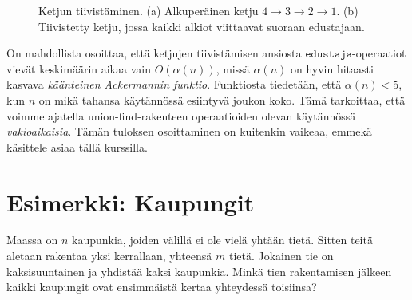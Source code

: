 \begin{figure}
\center
\begin{center}
\end{center}
\caption{Ketjun tiivistäminen. (a) Alkuperäinen ketju $4 \rightarrow 3 \rightarrow 2 \rightarrow 1$.
(b) Tiivistetty ketju, jossa kaikki alkiot viittaavat suoraan edustajaan.}
\label{fig:poltii}
\end{figure}

On mahdollista osoittaa, että ketjujen tiivistämisen ansiosta
$\texttt{edustaja}$-ope\-raatiot vievät keskimäärin aikaa vain
$O(\alpha(n))$, missä $\alpha(n)$ on hyvin hitaasti kasvava
\emph{käänteinen Ackermannin funktio}.
Funktiosta tiedetään, että $\alpha(n)<5$, kun $n$ on mikä tahansa
käytännössä esiintyvä joukon koko.
Tämä tarkoittaa, että voimme ajatella union-find-rakenteen
operaatioiden olevan käytännössä \emph{vakioaikaisia}.
Tämän tuloksen osoittaminen on kuitenkin vaikeaa,
emmekä käsittele asiaa tällä kurssilla.

\section{Esimerkki: Kaupungit}

Maassa on $n$ kaupunkia, joiden välillä ei ole vielä yhtään tietä.
Sitten teitä aletaan rakentaa yksi kerrallaan, yhteensä $m$ tietä.
Jokainen tie on kaksisuuntainen ja yhdistää kaksi kaupunkia.
Minkä tien rakentamisen jälkeen kaikki kaupungit ovat ensimmäistä
kertaa yhteydessä toisiinsa?

